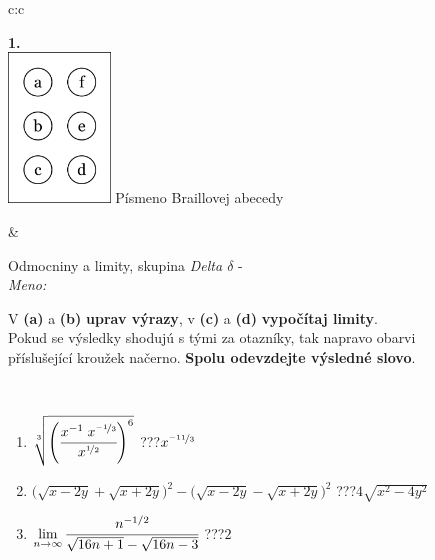 \documentclass[10pt]{report}
\begin{document}
\begin{tabular}{c:c}
\begin{minipage}[c][104.5mm][t]{0.5\linewidth}
\begin{center}
\begin{minipage}{0.20\linewidth}
\begin{center}
{\Huge\bfseries 1.} \\[2mm]
\includegraphics[height=40mm]{../images/braille.png}
{\small Písmeno Braillovej abecedy}
\end{center}
\end{minipage}
\end{center}
\end{minipage}
&
\begin{minipage}[c][104.5mm][t]{0.5\linewidth}
\begin{center}
\vspace{7mm}
{\huge Odmocniny a limity, skupina \textit{Delta $\delta$} -}\\[5mm]
\textit{Meno:}\phantom{xxxxxxxxxxxxxxxxxxxxxxxxxxxxxxxxxxxxxxxxxxxxxxxxxxxxxxxxxxxxxxxxx}\\[5mm]
\begin{minipage}{0.95\linewidth}
\begin{center}
V \textbf{(a)} a \textbf{(b)} \textbf{uprav výrazy}, v \textbf{(c)} a \textbf{(d)} \textbf{vypočítaj limity}.\\Pokud se výsledky shodujú s tými za otazníky, tak napravo obarvi\\příslušející kroužek načerno. \textbf{Spolu odevzdejte výsledné slovo}.
\end{center}
\end{minipage}
\\[1mm]
\begin{minipage}{0.79\linewidth}
\begin{center}
\begin{varwidth}{\linewidth}
\begin{enumerate}
\small
\item $\sqrt[3]{\left(\cfrac{x^{-1}\;x^{\nicefrac{-1}{3}}}{x^{\nicefrac{1}{2}}}\right)^{6}}$\quad \dotfill\; ???\;\dotfill \quad $x^{\nicefrac{-11}{3}}$
\item {\footnotesize{\scriptsize$\big(\sqrt{x-2y}+\sqrt{x+2y}\big)^2-\big(\sqrt{x-2y}-\sqrt{x+2y}\big)^2$}\quad \dotfill\; ???\;\dotfill \quad $4\sqrt{x^2-4y^2}$}
\item $\lim\limits_{n\to\infty}\cfrac{n^{-1/2}}{\sqrt{16n+1}-\sqrt{16n-3}}$\quad \dotfill\; ???\;\dotfill \quad $2$

\end{enumerate}
\end{varwidth}
\end{center}
\end{minipage}
\end{center}
\end{minipage}
\end{tabular}
\end{document}
